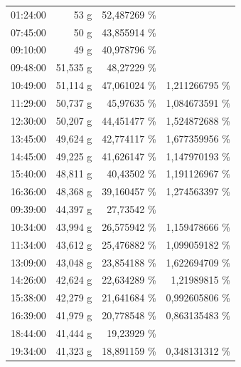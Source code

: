 \begin {table}[th]
\begin{tabular}{||r|r|r||r|}
	\cline{1-3}01:24:00 & 53 g  & 52,487269 \% & \multicolumn{1}{r}{} \\
	\cline{1-3}\rowcolor[rgb]{ .647,  .647,  .647} 07:45:00 & \multicolumn{1}{|r|}{\cellcolor[rgb]{ 1,  1,  1} 50 g} & \cellcolor[rgb]{ 1,  1,  1}43,855914 \% & \multicolumn{1}{r}{\cellcolor[rgb]{ 1,  1,  1}} \\
	\cline{1-3}09:10:00 & 49 g  & 40,978796 \% & \multicolumn{1}{r}{} \\
	\cline{1-3}09:48:00 & \cellcolor[rgb]{ .608,  .761,  .902}51,535 g & 48,27229 \% & \multicolumn{1}{r}{} \\
	\hline
	10:49:00 & 51,114 g & 47,061024 \% & 1,211266795 \% \\
	\hline
	11:29:00 & 50,737 g & 45,97635 \% & 1,084673591 \% \\
	\hline
	12:30:00 & 50,207 g & 44,451477 \% & 1,524872688 \% \\
	\hline
	13:45:00 & 49,624 g & 42,774117 \% & 1,677359956 \% \\
	\hline
	14:45:00 & 49,225 g & 41,626147 \% & 1,147970193 \% \\
	\hline
	15:40:00 & 48,811 g & 40,43502 \% & 1,191126967 \% \\
	\hline
	16:36:00 & 48,368 g & 39,160457 \% & 1,274563397 \% \\
	\hline
	\hline
	\rowcolor[rgb]{ .647,  .647,  .647} 09:39:00 & \multicolumn{1}{|r|}{\cellcolor[rgb]{ 1,  1,  1}44,397 g} & \cellcolor[rgb]{ 0,  .439,  .753}27,73542 \% & \multicolumn{1}{|r}{\cellcolor[rgb]{ 1,  1,  1}} \\
	\hline
	10:34:00 & 43,994 g & 26,575942 \% & 1,159478666 \% \\
	\hline
	11:34:00 & 43,612 g & 25,476882 \% & 1,099059182 \% \\
	\hline
	13:09:00 & 43,048 g & 23,854188 \% & 1,622694709 \% \\
	\hline
	14:26:00 & 42,624 g & \cellcolor[rgb]{ 0,  .69,  .941}22,634289 \% & 1,21989815 \% \\
	\hline
	15:38:00 & 42,279 g & \cellcolor[rgb]{ 0,  .69,  .941}21,641684 \% & 0,992605806 \% \\
	\hline
	16:39:00 & 41,979 g & \cellcolor[rgb]{ 0,  .69,  .941}20,778548 \% & 0,863135483 \% \\
	\hline
	18:44:00 & 41,444 g & \cellcolor[rgb]{ 0,  .69,  .941}19,23929 \% & \multicolumn{1}{r}{} \\
	\hline
	19:34:00 & 41,323 g & \cellcolor[rgb]{ 0,  .69,  .941}18,891159 \% & 0,348131312 \% \\

\end{tabular}
\end{table}
